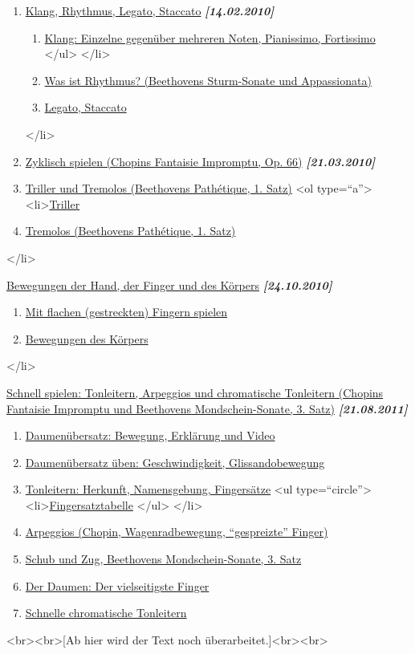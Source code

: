 \begin{enumerate} 
 \item \hyperref[c1iii1]{Klang, Rhythmus, Legato, Staccato} \textbf{\textit{[14.02.2010]}}
  \begin{enumerate}[label={\alph*.}] 
   <li>\hyperref[c1iii1a]{Was ist ein \enquote{Guter Klang}?}
   <ul type=\enquote{circle}>
    <li>\hyperref[c1iii1a1]{Der Basisanschlag}
    \item \hyperref[c1iii1a2]{Klang: Einzelne gegenüber mehreren Noten, Pianissimo, Fortissimo}
   </ul>
   </li>
   \item \hyperref[c1iii1b]{Was ist Rhythmus? (Beethovens Sturm-Sonate und Appassionata)}
   \item \hyperref[c1iii1c]{Legato, Staccato}
  \end{enumerate}
 </li>
 \item \hyperref[c1iii2]{Zyklisch spielen (Chopins Fantaisie Impromptu, Op. 66)} \textbf{\textit{[21.03.2010]}}

 \item \hyperref[c1iii3]{Triller und Tremolos (Beethovens Pathétique, 1. Satz)}
  <ol type=\enquote{a}>
   <li>\hyperref[c1iii3]{Triller}
   \item \hyperref[c1iii3b]{Tremolos (Beethovens Pathétique, 1. Satz)}
   \end{enumerate}
 </li>
 \item \hyperref[c1iii4]{Bewegungen der Hand, der Finger und des Körpers} \textbf{\textit{[24.10.2010]}}
  \begin{enumerate}[label={\alph*.}] 
   <li>\hyperref[c1iii4]{Bewegungen der Hand}
   \item \hyperref[c1iii4b]{Mit flachen (gestreckten) Fingern spielen}
   \item \hyperref[c1iii4c]{Bewegungen des Körpers}
   \end{enumerate}
 </li>
 \item \hyperref[c1iii5]{Schnell spielen: Tonleitern, Arpeggios und chromatische Tonleitern (Chopins Fantaisie Impromptu und Beethovens Mondschein-Sonate, 3. Satz)} \textbf{\textit{[21.08.2011]}}
  \begin{enumerate}[label={\alph*.}] 
   <li>\hyperref[c1iii5a]{Tonleitern: Daumenuntersatz, Daumenübersatz}
   \item \hyperref[c1iii5b]{Daumenübersatz: Bewegung, Erklärung und Video}
   \item \hyperref[c1iii5c]{Daumenübersatz üben: Geschwindigkeit, Glissandobewegung}
   \item \hyperref[c1iii5d]{Tonleitern: Herkunft, Namensgebung, Fingersätze}
    <ul type=\enquote{circle}>
     <li>\hyperref[table]{Fingersatztabelle}
    </ul>
   </li>
   \item \hyperref[c1iii5e]{Arpeggios (Chopin, Wagenradbewegung, \enquote{gespreizte} Finger)}
   \item \hyperref[c1iii5f]{Schub und Zug, Beethovens Mondschein-Sonate, 3. Satz}
   \item \hyperref[c1iii5g]{Der Daumen: Der vielseitigste Finger}
   \item \hyperref[c1iii5h]{Schnelle chromatische Tonleitern}
   \end{enumerate}<br><br>[Ab hier wird der Text noch überarbeitet.]<br><br>
